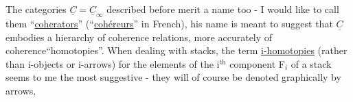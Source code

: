 The categories $\underline{C} = \underline{C}_{\infty}$ described before merit a name too - I would
like to call them ``\uline{coherators}'' (``\uline{coh\'ereurs}'' in French), 
his name is meant to suggest that $\underline{C}$ embodies a hierarchy of coherence
relations, more accurately of coherence``homotopies''. When dealing with
stacks, the term \uline{i-homotopies} (rather than i-objects or i-arrows) for
the elements of the i$^{\mathrm{th}}$ component F$_{i}$ of a stack seems to me the most
suggestive - they will of course be denoted graphically by arrows,

